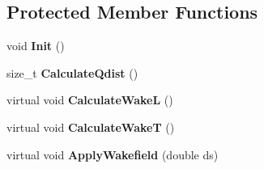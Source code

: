 \subsection*{Protected Member Functions}
\begin{DoxyCompactItemize}
\item 
\mbox{\label{classParticleTracking_1_1WakeFieldProcess_a659230356b4d3f0f57d2d6d17e6a3415}} 
void {\bfseries Init} ()
\item 
\mbox{\label{classParticleTracking_1_1WakeFieldProcess_a0eed87487456a8b30834747958880317}} 
size\+\_\+t {\bfseries Calculate\+Qdist} ()
\item 
\mbox{\label{classParticleTracking_1_1WakeFieldProcess_a40774fddb2773cd0c21b9ab7f25f9385}} 
virtual void {\bfseries Calculate\+WakeL} ()
\item 
\mbox{\label{classParticleTracking_1_1WakeFieldProcess_a59a41f6e7186fe7effb5522c278e911c}} 
virtual void {\bfseries Calculate\+WakeT} ()
\item 
\mbox{\label{classParticleTracking_1_1WakeFieldProcess_a559c79cbaadbc0769cb208c090e57105}} 
virtual void {\bfseries Apply\+Wakefield} (double ds)
\end{DoxyCompactItemize}
